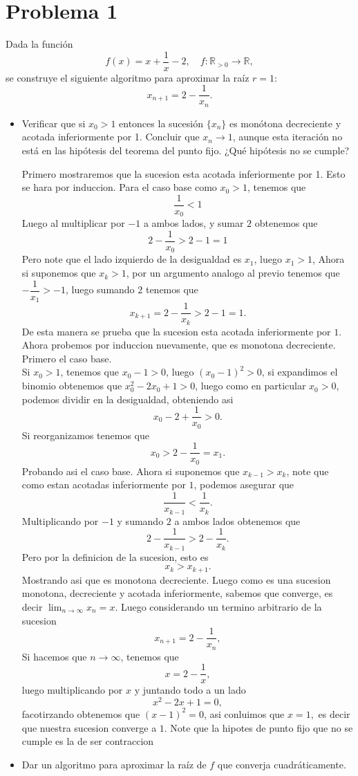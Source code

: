 
\section{Problema 1}
Dada la función
\[
f(x) = x + \frac{1}{x} - 2, \quad f: \mathbb{R}_{>0} \to \mathbb{R},
\]
se construye el siguiente algoritmo para aproximar la raíz $r = 1$:
\[
x_{n+1} = 2 - \frac{1}{x_n}.
\]

\begin{itemize}
    \item Verificar que si $x_0 > 1$ entonces la sucesión $\{x_n\}$ es monótona decreciente y acotada inferiormente por 1. Concluir que $x_n \to 1$, aunque esta iteración no está en las hipótesis del teorema del punto fijo. ¿Qué hipótesis no se cumple?
    \begin{sproof} Primero mostraremos que la sucesion esta acotada inferiormente por 1. Esto se hara por induccion. Para el caso base como $x_0>1$, tenemos que
    $$\frac{1}{x_0}<1$$
    Luego al multiplicar por $-1$ a ambos lados, y sumar $2$ obtenemos que
    $$2-\frac{1}{x_0}>2-1=1$$
    Pero note que el lado izquierdo de la desigualdad es $x_1$, luego $x_1>1$, Ahora si suponemos que $x_k>1$, por un argumento analogo al previo tenemos que $-\dfrac{1}{x_1}>-1$, luego sumando $2$ tenemos que
    $$x_{k+1}=2-\frac{1}{x_k}>2-1=1.$$
    De esta manera se prueba que la sucesion esta acotada inferiormente por $1.$\\
    Ahora probemos por induccion nuevamente, que es monotona decreciente. Primero el caso base.\\
        Si $x_0>1$, tenemos que $x_0-1>0$, luego $(x_0-1)^2>0$, si expandimos el binomio obtenemos que $x_0^2-2x_0+1>0$, luego como en particular $x_0>0$, podemos dividir en la desigualdad, obteniendo asi
        $$x_0-2+\frac{1}{x_0}>0.$$
        Si reorganizamos tenemos que
        $$x_0>2-\frac{1}{x_0}=x_1.$$
        Probando asi el caso base. Ahora si suponemos que $x_{k-1}>x_k$, note que como estan acotadas inferiormente por $1$, podemos asegurar que
        $$\frac{1}{x_{k-1}}<\frac{1}{x_k}.$$
        Multiplicando por $-1$ y sumando $2$ a ambos lados obtenemos que
        $$2-\frac{1}{x_{k-1}}>2-\frac{1}{x_k}.$$
        Pero por la definicion de la sucesion, esto es
        $$x_{k}>x_{k+1}.$$
        Mostrando asi que es monotona decreciente. Luego como es una sucesion monotona, decreciente y acotada inferiormente, sabemos que converge, es decir $\lim_{n\to\infty}x_n=x$. Luego considerando un termino arbitrario de la sucesion 
        $$x_{n+1}=2-\frac{1}{x_n},$$
        Si hacemos que $n\to\infty$, tenemos que 
        $$x=2-\frac{1}{x},$$
        luego multiplicando por $x$ y juntando todo a un lado
        $$x^2-2x+1=0,$$
        facotirzando obtenemos que $(x-1)^2=0$, asi conluimos que $x=1,$ es decir que nuestra sucesion converge a $1.$
        Note que la hipotes de punto fijo que no se cumple es la de ser contraccion
    \end{sproof}
    \item Dar un algoritmo para aproximar la raíz de $f$ que converja cuadráticamente.
\end{itemize}
